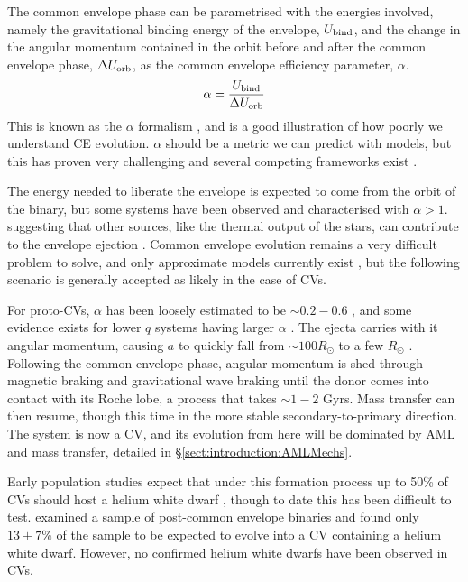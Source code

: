 The common envelope phase can be parametrised with the energies involved, namely the gravitational binding energy of the envelope, $U_{\rm bind}$, and the change in the angular momentum contained in the orbit before and after the common envelope phase, $\Delta U_{\rm orb}$, as the common envelope efficiency parameter, $\alpha$.
\begin{equation}
    \alpha = \frac{U_{\rm bind}}{\Delta U_{\rm orb}}
\end{equation}
This is known as the $\alpha$ formalism \citep{demarco2011}, and is a good illustration of how poorly we understand CE evolution. $\alpha$ should be a metric we can predict with models, but this has proven very challenging and several competing frameworks exist \citep{ivanova2020}. 

The energy needed to liberate the envelope is expected to come from the orbit of the binary, but some systems have been observed and characterised with $\alpha > 1$. suggesting that other sources, like the thermal output of the stars, can contribute to the envelope ejection \citep{demarco2011, ivanova2013}. Common envelope evolution remains a very difficult problem to solve, and only approximate models currently exist \citep{ivanova2020}, but the following scenario is generally accepted as likely in the case of CVs.

For proto-CVs, $\alpha$ has been loosely estimated to be $\sim 0.2 - 0.6$ \citep{politano2007}, and some evidence exists for lower $q$ systems having larger $\alpha$ \citep{passy2013}. The ejecta carries with it angular momentum, causing $a$ to quickly fall from $\sim 100 R_\odot$ to a few $R_\odot$ \citep{politano2007}. 
Following the common-envelope phase, angular momentum is shed through magnetic braking and gravitational wave braking until the donor comes into contact with its Roche lobe, a process that takes $\sim 1-2$ Gyrs. Mass transfer can then resume, though this time in the more stable secondary-to-primary direction. The system is now a CV, and its evolution from here will be dominated by AML and mass transfer, detailed in \S\ref{sect:introduction:AMLMechs}.

Early population studies expect that under this formation process up to 50\% of CVs should host a helium white dwarf \citep{politano1996}, though to date this has been difficult to test. 
\citet{zorotovic2010} examined a sample of post-common envelope binaries and found only $13\pm7\%$ of the sample to be expected to evolve into a CV containing a helium white dwarf. However, no confirmed helium white dwarfs have been observed in CVs.


